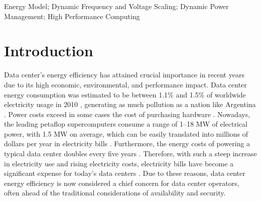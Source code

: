 \documentclass{ieeeaccess}
\begin{document}
\begin{keywords}
Energy Model; Dynamic Frequency and Voltage Scaling; Dynamic Power Management; High Performance Computing
\end{keywords}

\titlepgskip=-15pt

\maketitle

\section{Introduction}
Data center's energy efficiency has attained crucial importance in recent years due to its high economic, environmental, and performance impact. 
Data center energy consumption was estimated to be between 1.1\% and 1.5\% of worldwide electricity usage in 2010 \cite{Dayarathna2016DataSurvey,Corcoran2017EmergingICT}, generating as much pollution as a nation like Argentina  \cite{Mathew2012Energy-awareNetworks}.
Power costs exceed in some cases the cost of purchasing hardware \cite{Rivoire2007ModelsOptimizations}. 
Nowadays, the leading petaflop supercomputers consume a range of 1–18 MW of electrical power, with 1.5 MW on average, which can be easily translated into millions of dollars per year in electricity bills \cite{Group2012HandbookSahni}.
Furthermore, the energy costs of powering a typical data center doubles every five years \cite{Buyya2013MasteringProgramming}.
Therefore, with such a steep increase in electricity use and rising electricity costs, electricity bills have become a significant expense for today's data centers \cite{Poess2008EnergyResults,Gao2013QualityCenters}. 
Due to these reasons, data center energy efficiency is now considered a chief concern for data center operators, often ahead of the traditional considerations of availability and security.
\end{document}
